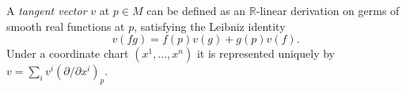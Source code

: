 
A \emph{tangent vector} $v$ at $p\in M$ can be defined as an $\mathbb R$-linear derivation on germs of smooth real functions at $p$, satisfying the Leibniz identity
\[
v(fg)=f(p)v(g)+g(p)v(f).
\]
Under a coordinate chart $(x^1,\ldots,x^n)$ it is represented uniquely by $v=\sum_i v^i(\partial/\partial x^i)_p$.
